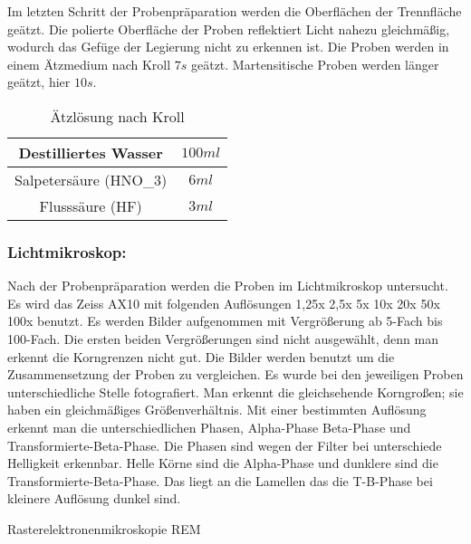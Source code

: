 Im letzten Schritt der Probenpräparation werden die Oberflächen der Trennfläche geätzt. Die polierte Oberfläche der Proben reflektiert Licht nahezu gleichmäßig, wodurch das Gefüge der Legierung nicht zu erkennen ist. 
Die Proben werden in einem Ätzmedium nach Kroll $7s$ geätzt. Martensitische Proben werden länger geätzt, hier $10s$. 

\begin{table}[h]
	\centering
	\begin{tabular}{|c|c|}
		
		\hline 
		Destilliertes Wasser
		& $100ml$
		\\ 
		\hline 
		Salpetersäure (HNO_{3})	& $6ml$
		\\ 
		\hline 
		Flusssäure (HF) & $3ml$
		\\ 
		\hline 
	\end{tabular} 
	\caption{Ätzlösung nach Kroll}
	\label{tab:Ätz_Kroll}
\end{table}

\subsubsection{Lichtmikroskop:}


Nach der Probenpräparation werden die Proben im Lichtmikroskop untersucht. Es wird das Zeiss AX10 mit folgenden Auflösungen 1,25x 2,5x 5x 10x 20x 50x 100x benutzt. Es werden Bilder aufgenommen mit Vergrößerung ab 5-Fach bis 100-Fach. Die ersten beiden Vergrößerungen sind nicht ausgewählt, denn man erkennt die Korngrenzen nicht gut. Die Bilder werden benutzt um die Zusammensetzung der Proben zu vergleichen. 
Es wurde bei den jeweiligen Proben unterschiedliche Stelle fotografiert. Man erkennt die gleichsehende Korngroßen; sie haben ein gleichmäßiges Größenverhältnis. Mit einer bestimmten Auflösung erkennt man die unterschiedlichen Phasen, Alpha-Phase Beta-Phase und Transformierte-Beta-Phase. Die Phasen sind wegen der Filter bei unterschiede Helligkeit erkennbar. Helle Körne sind die Alpha-Phase und dunklere sind die Transformierte-Beta-Phase. Das liegt an die Lamellen das die T-B-Phase bei kleinere Auflösung dunkel sind. 


Rasterelektronenmikroskopie REM


